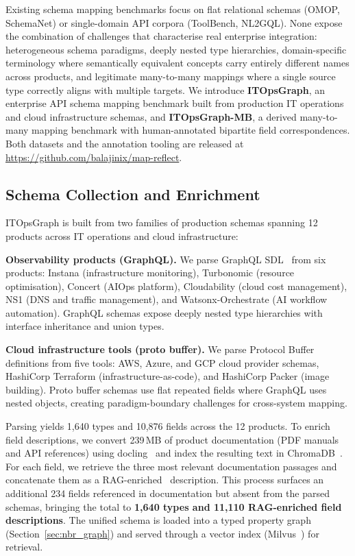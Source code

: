 \documentclass[sigconf, nonacm]{acmart}
\begin{document}
Existing schema mapping benchmarks focus on flat relational schemas
(OMOP, SchemaNet) or single-domain API corpora (ToolBench, NL2GQL).
None expose the combination of challenges that characterise real
enterprise integration: heterogeneous schema paradigms, deeply nested
type hierarchies, domain-specific terminology where semantically
equivalent concepts carry entirely different names across products,
and legitimate many-to-many mappings where a single source type
correctly aligns with multiple targets.
We introduce \textbf{ITOpsGraph}, an enterprise API schema mapping
benchmark built from production IT operations and cloud infrastructure
schemas, and \textbf{ITOpsGraph-MB}, a derived many-to-many mapping
benchmark with human-annotated bipartite field correspondences.
Both datasets and the annotation tooling are released at
\url{https://github.com/balajinix/map-reflect}.

\subsection{Schema Collection and Enrichment}

ITOpsGraph is built from two families of production schemas spanning
12 products across IT operations and cloud infrastructure:

\textbf{Observability products (GraphQL).}
We parse GraphQL SDL~\cite{graphql2021spec} from six products:
Instana (infrastructure monitoring), Turbonomic (resource optimisation),
Concert (AIOps platform), Cloudability (cloud cost management),
NS1 (DNS and traffic management), and Watsonx-Orchestrate (AI
workflow automation). GraphQL schemas expose deeply nested type
hierarchies with interface inheritance and union types.

\textbf{Cloud infrastructure tools (proto buffer).}
We parse Protocol Buffer~\cite{google2023protobuf} definitions from
five tools: AWS, Azure, and GCP cloud provider schemas, HashiCorp
Terraform (infrastructure-as-code), and HashiCorp Packer (image
building). Proto buffer schemas use flat repeated fields where
GraphQL uses nested objects, creating paradigm-boundary challenges
for cross-system mapping.

Parsing yields 1,640 types and 10,876 fields across the 12 products.
To enrich field descriptions, we convert 239\,MB of product
documentation (PDF manuals and API references) using
docling~\cite{auer2024docling} and index the resulting text in
ChromaDB~\cite{chromadb2023}. For each field, we retrieve the
three most relevant documentation passages and concatenate them
as a RAG-enriched~\cite{lewis2020retrieval} description. This
process surfaces an additional 234 fields referenced in
documentation but absent from the parsed schemas, bringing the
total to \textbf{1,640 types and 11,110 RAG-enriched field
descriptions}. The unified schema is loaded into a typed property
graph (Section~\ref{sec:nbr_graph}) and served through a
vector index (Milvus~\cite{wang2021milvus}) for retrieval.
\end{document}

